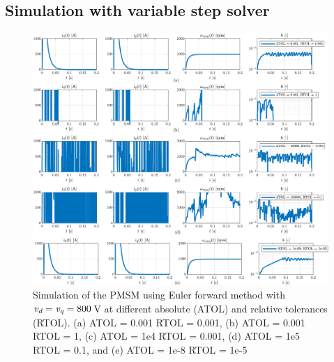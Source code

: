 \subsection{Simulation with variable step solver}
\begin{figure}[t!b!]
	\centering
	\includegraphics[width=\textwidth]{Figures/ef_MotorCase_ode45_Atol_Rtol.pdf}
	\caption{Simulation of the PMSM using Euler forward method with $\textit{v\textsubscript{d}}=\textit{v\textsubscript{q}}=800\,$V at different absolute (ATOL) and relative tolerances (RTOL). (a) ATOL = 0.001 RTOL = 0.001, (b) ATOL = 0.001 RTOL = 1, (c) ATOL = 1e4 RTOL = 0.001, (d) ATOL = 1e5 RTOL = 0.1, and (e) ATOL = 1e-8 RTOL = 1e-5}
	\label{fig:EMresOde45}
\end{figure}
